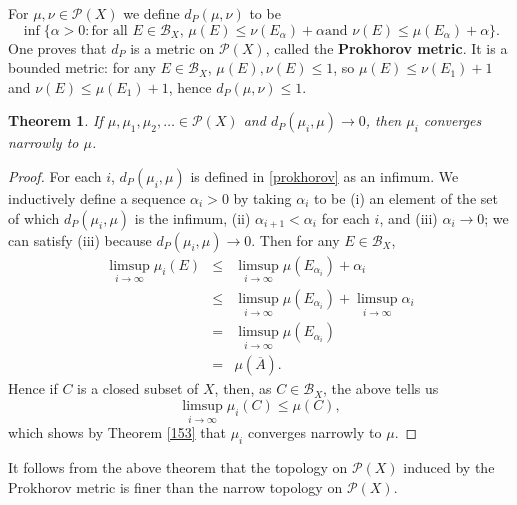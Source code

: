\documentclass{article}
\newtheorem{theorem}{Theorem}
\theoremstyle{definition}
\begin{document}
For $\mu,\nu \in \mathscr{P}(X)$ we define $d_P(\mu,\nu)$ to be
\begin{equation}
\inf\{\alpha>0: \textrm{for all $E \in \mathscr{B}_X$, $\mu(E) \leq \nu(E_\alpha)+\alpha$
and $\nu(E) \leq \mu(E_\alpha)+\alpha$}\}.
\label{prokhorov}
\end{equation}
One proves that $d_P$ is a metric on $\mathscr{P}(X)$,  called the \textbf{Prokhorov metric}.
It is a bounded metric: for any $E \in \mathscr{B}_X$, $\mu(E),\nu(E) \leq 1$, so
$\mu(E) \leq \nu(E_1)+1$ and $\nu(E) \leq \mu(E_1)+1$, hence $d_P(\mu,\nu) \leq 1$. 




\begin{theorem}
If $\mu,\mu_1,\mu_2,\ldots \in\mathscr{P}(X)$ and $d_P(\mu_i,\mu) \to 0$, then $\mu_i$  converges narrowly
to $\mu$.
\end{theorem}
\begin{proof}
For each $i$, $d_P(\mu_i,\mu)$ is defined in \eqref{prokhorov} as an infimum. We inductively define
a sequence $\alpha_i>0$ by taking $\alpha_i$ to be (i)
an element of the set of which $d_P(\mu_i,\mu)$ is the infimum, (ii) 
$\alpha_{i+1}<\alpha_i$ for each $i$, and (iii) $\alpha_i \to 0$; we can satisfy (iii) because $d_P(\mu_i,\mu) \to 0$.
Then for any $E \in \mathscr{B}_X$,
\begin{eqnarray*}
\limsup_{i \to \infty} \mu_i(E)&\leq&\limsup_{i \to \infty} \mu(E_{\alpha_i})+\alpha_i\\
&\leq&\limsup_{i \to \infty} \mu(E_{\alpha_i}) + \limsup_{i \to \infty} \alpha_i\\
&=&\limsup_{i \to \infty} \mu(E_{\alpha_i})\\
&=&\mu(\overline{A}).
\end{eqnarray*}
Hence if $C$ is a closed subset of $X$, then, as $C \in \mathscr{B}_X$, the above tells us
\[
\limsup_{i \to \infty} \mu_i(C) \leq \mu(C),
\]
which shows by Theorem \ref{153} that $\mu_i$  converges narrowly to $\mu$.
\end{proof}

It follows from the above theorem that the topology on $\mathscr{P}(X)$ induced by the Prokhorov metric is finer than the narrow
topology on
$\mathscr{P}(X)$.
\end{document}
